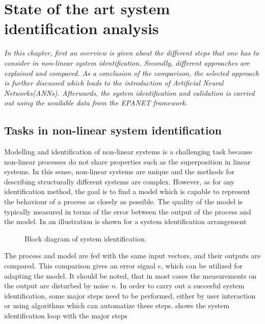 \chapter{State of the art system identification analysis}
\label{identification_methods}

\emph{In this chapter, first an overview is given about the different steps that one has to consider in non-linear system identification. Secondly, different approaches are explained and compared. As a conclusion of the comparison, the selected approach is further discussed which leads to the introduction of Artificial Neural Networks(ANNs). Afterwards, the system identification and validation is carried out using the available data from the EPANET framework.}

\section{Tasks in non-linear system identification}
\label{tasks_nonlinear_sys_identification}

Modelling and identification of non-linear systems is a challenging task because non-linear processes do not share properties such as the superposition in linear systems. In this sense, non-linear systems are unique and the methods for describing structurally different systems are complex. However, as for any identification method, the goal is to find a model which is capable to represent the behaviour of a process as closely as possible. The quality of the model is typically measured in terms of the error between the output of the process and the model. In  an illustration is shown for a system identification arrangement 
\vspace{-3mm}
\begin{figure}[H]
\centering
 
\caption{Block diagram of system identification.}
\label{fig:nonlin_block}
\end{figure}

\vspace{-3mm}

The process and model are fed with the same input vectors, and their outputs are compared. This comparison gives an error signal $e$, which can be utilized for adapting the model. It should be noted, that in most cases the measurements on the output are disturbed by noise $n$. In order to carry out a succesful system identification, some major steps need to be performed, either by user interaction or using algorithms which can automatize these steps.  shows the system identification loop with the major steps

